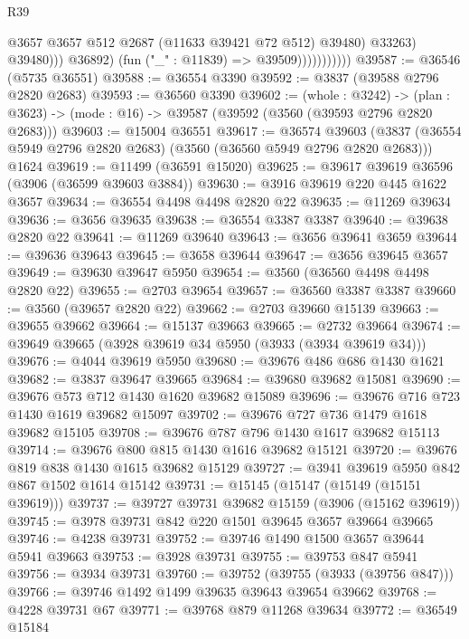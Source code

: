 \begin{lexlean}{R39}
\begin{coremodule}
                                    @3657
                                    @3657
                                    @512
                                    @2687
                                    (@11633 @39421 @72 @512)
                                    @39480)
                                  @33263)
                                @39480)))
                          @36892)
                        (fun ("_" : @11839) => @39509)))))))))))
@39587 := @36546 (@5735 @36551)
@39588 := @36554 @3390
@39592 := @3837 (@39588 @2796 @2820 @2683)
@39593 := @36560 @3390
@39602 := (whole : @3242) ->
  (plan : @3623) -> (mode : @16) -> @39587 (@39592 (@3560 (@39593 @2796 @2820 @2683)))
@39603 := @15004 @36551
@39617 := @36574
    @39603
    (@3837 (@36554 @5949 @2796 @2820 @2683) (@3560 (@36560 @5949 @2796 @2820 @2683)))
    @1624
@39619 := @11499 (@36591 @15020)
@39625 := @39617 @39619 @36596 (@3906 (@36599 @39603 @3884))
@39630 := @3916 @39619 @220 @445 @1622 @3657
@39634 := @36554 @4498 @4498 @2820 @22
@39635 := @11269 @39634
@39636 := @3656 @39635
@39638 := @36554 @3387 @3387
@39640 := @39638 @2820 @22
@39641 := @11269 @39640
@39643 := @3656 @39641 @3659
@39644 := @39636 @39643
@39645 := @3658 @39644
@39647 := @3656 @39645 @3657
@39649 := @39630 @39647 @5950
@39654 := @3560 (@36560 @4498 @4498 @2820 @22)
@39655 := @2703 @39654
@39657 := @36560 @3387 @3387
@39660 := @3560 (@39657 @2820 @22)
@39662 := @2703 @39660 @15139
@39663 := @39655 @39662
@39664 := @15137 @39663
@39665 := @2732 @39664
@39674 := @39649 @39665 (@3928 @39619 @34 @5950 (@3933 (@3934 @39619 @34)))
@39676 := @4044 @39619 @5950
@39680 := @39676 @486 @686 @1430 @1621
@39682 := @3837 @39647 @39665
@39684 := @39680 @39682 @15081
@39690 := @39676 @573 @712 @1430 @1620 @39682 @15089
@39696 := @39676 @716 @723 @1430 @1619 @39682 @15097
@39702 := @39676 @727 @736 @1479 @1618 @39682 @15105
@39708 := @39676 @787 @796 @1430 @1617 @39682 @15113
@39714 := @39676 @800 @815 @1430 @1616 @39682 @15121
@39720 := @39676 @819 @838 @1430 @1615 @39682 @15129
@39727 := @3941 @39619 @5950 @842 @867 @1502 @1614 @15142
@39731 := @15145 (@15147 (@15149 (@15151 @39619)))
@39737 := @39727 @39731 @39682 @15159 (@3906 (@15162 @39619))
@39745 := @3978 @39731 @842 @220 @1501 @39645 @3657 @39664 @39665
@39746 := @4238 @39731
@39752 := @39746 @1490 @1500 @3657 @39644 @5941 @39663
@39753 := @3928 @39731
@39755 := @39753 @847 @5941
@39756 := @3934 @39731
@39760 := @39752 (@39755 (@3933 (@39756 @847)))
@39766 := @39746 @1492 @1499 @39635 @39643 @39654 @39662
@39768 := @4228 @39731 @67
@39771 := @39768 @879 @11268 @39634
@39772 := @36549 @15184

\end{coremodule}
\end{lexlean}
